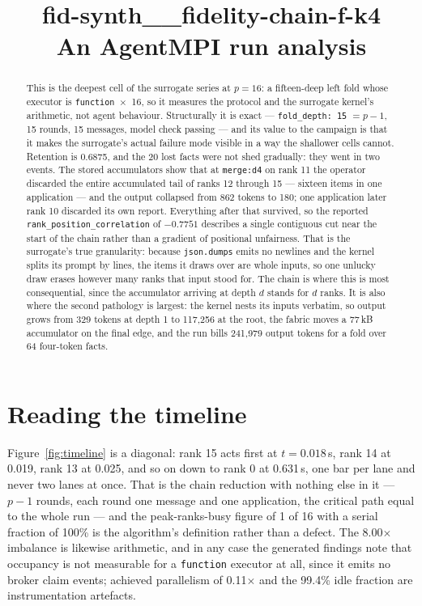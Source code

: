 \documentclass[11pt]{article}
\title{\textbf{fid-synth\_\_fidelity-chain-f-k4}\\[2pt]\large An AgentMPI run analysis}
\author{}
\date{}
\begin{document}
\maketitle

\begin{abstract}
This is the deepest cell of the surrogate series at $p=16$: a fifteen-deep left fold whose
executor is \texttt{function}~$\times$~16, so it measures the protocol and the surrogate
kernel's arithmetic, not agent behaviour. Structurally it is exact ---
\texttt{fold\_depth: 15} $= p-1$, 15 rounds, 15 messages, model check passing --- and its
value to the campaign is that it makes the surrogate's actual failure mode visible in a way
the shallower cells cannot. Retention is 0.6875, and the 20 lost facts were not shed
gradually: they went in two events. The stored accumulators show that at
\texttt{merge:d4} on rank 11 the operator discarded the entire accumulated tail of ranks
12 through 15 --- sixteen items in one application --- and the output collapsed from 862
tokens to 180; one application later rank 10 discarded its own report. Everything after that
survived, so the reported \texttt{rank\_position\_correlation} of $-0.7751$ describes a
single contiguous cut near the start of the chain rather than a gradient of positional
unfairness. That is the surrogate's true granularity: because \texttt{json.dumps} emits no
newlines and the kernel splits its prompt by lines, the items it draws over are whole
inputs, so one unlucky draw erases however many ranks that input stood for. The chain is
where this is most consequential, since the accumulator arriving at depth $d$ stands for
$d$ ranks. It is also where the second pathology is largest: the kernel nests its inputs
verbatim, so output grows from 329 tokens at depth 1 to 117{,}256 at the root, the fabric
moves a 77\,kB accumulator on the final edge, and the run bills 241{,}979 output tokens for
a fold over 64 four-token facts.
\end{abstract}



\section{Reading the timeline}

Figure~\ref{fig:timeline} is a diagonal: rank 15 acts first at $t=0.018$\,s, rank 14 at
0.019, rank 13 at 0.025, and so on down to rank 0 at 0.631\,s, one bar per lane and never
two lanes at once. That is the chain reduction with nothing else in it --- $p-1$ rounds,
each round one message and one application, the critical path equal to the whole run --- and
the peak-ranks-busy figure of 1 of 16 with a serial fraction of 100\% is the algorithm's
definition rather than a defect. The 8.00$\times$ imbalance is likewise arithmetic, and in
any case the generated findings note that occupancy is not measurable for a
\texttt{function} executor at all, since it emits no broker claim events; achieved
parallelism of 0.11$\times$ and the 99.4\% idle fraction are instrumentation artefacts.
\end{document}
